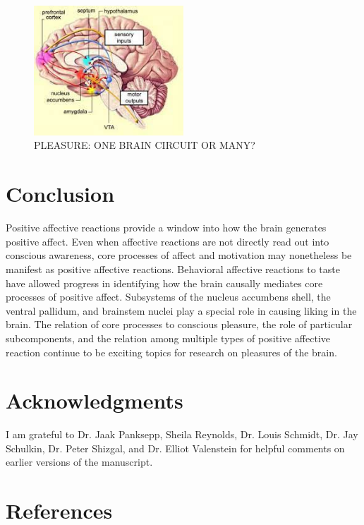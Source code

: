 \documentclass[conference]{IEEEtran}
\begin{document}
\begin{figure}[h]
  \centering
  \includegraphics[width=0.5\textwidth]{pic-5.jpeg}
  \caption{PLEASURE: ONE BRAIN CIRCUIT OR MANY?}
  \label{fig:example}
\end{figure}

\newpage


\section{Conclusion}
Positive affective reactions provide a window into
how the brain generates positive affect. Even when affective reactions are not directly read out into conscious
awareness, core processes of affect and motivation may
nonetheless be manifest as positive affective reactions.
Behavioral affective reactions to taste have allowed
progress in identifying how the brain causally mediates
core processes of positive affect. Subsystems of the nucleus accumbens shell, the ventral pallidum, and brainstem nuclei play a special role in causing liking in the
brain. The relation of core processes to conscious pleasure, the role of particular subcomponents, and the relation among multiple types of positive affective reaction
continue to be exciting topics for research on pleasures
of the brain.



\section{Acknowledgments}

I am grateful to Dr. Jaak Panksepp, Sheila Reynolds,
Dr. Louis Schmidt, Dr. Jay Schulkin, Dr. Peter Shizgal,
and Dr. Elliot Valenstein for helpful comments on earlier versions of the manuscript.




\section*{References}
\end{document}
